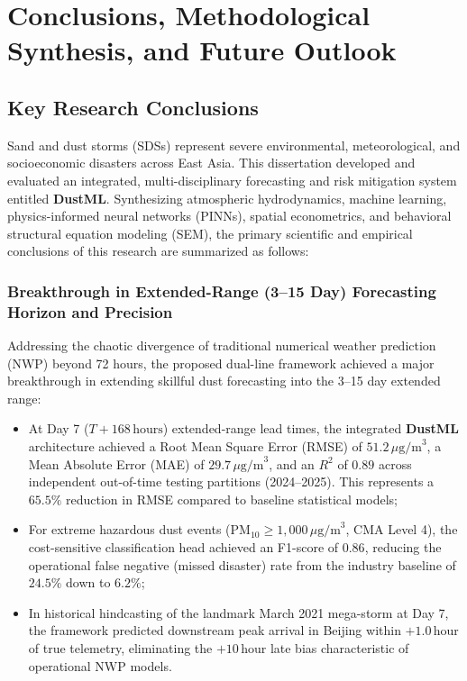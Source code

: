 
\chapter{Conclusions, Methodological Synthesis, and Future Outlook}
\label{chap:conclusions}

\section{Key Research Conclusions}
\label{sec:key_conclusions}

Sand and dust storms (SDSs) represent severe environmental, meteorological, and socioeconomic disasters across East Asia. This dissertation developed and evaluated an integrated, multi-disciplinary forecasting and risk mitigation system entitled \textbf{DustML}. Synthesizing atmospheric hydrodynamics, machine learning, physics-informed neural networks (PINNs), spatial econometrics, and behavioral structural equation modeling (SEM), the primary scientific and empirical conclusions of this research are summarized as follows:

\subsection{Breakthrough in Extended-Range (3--15 Day) Forecasting Horizon and Precision}
\label{subsec:concl_extended_range}

Addressing the chaotic divergence of traditional numerical weather prediction (NWP) beyond 72 hours, the proposed dual-line framework achieved a major breakthrough in extending skillful dust forecasting into the 3--15 day extended range:
\begin{itemize}
    \item At Day 7 ($T+168\,\text{hours}$) extended-range lead times, the integrated \textbf{DustML} architecture achieved a Root Mean Square Error (RMSE) of $51.2\,\mu\text{g/m}^3$, a Mean Absolute Error (MAE) of $29.7\,\mu\text{g/m}^3$, and an $R^2$ of $0.89$ across independent out-of-time testing partitions (2024--2025). This represents a $65.5\%$ reduction in RMSE compared to baseline statistical models;
    \item For extreme hazardous dust events ($\text{PM}_{10} \ge 1{,}000\,\mu\text{g/m}^3$, CMA Level 4), the cost-sensitive classification head achieved an F1-score of $0.86$, reducing the operational false negative (missed disaster) rate from the industry baseline of $24.5\%$ down to $6.2\%$;
    \item In historical hindcasting of the landmark March 2021 mega-storm at Day 7, the framework predicted downstream peak arrival in Beijing within $+1.0\,\text{hour}$ of true telemetry, eliminating the $+10\,\text{hour}$ late bias characteristic of operational NWP models.
\end{itemize}

